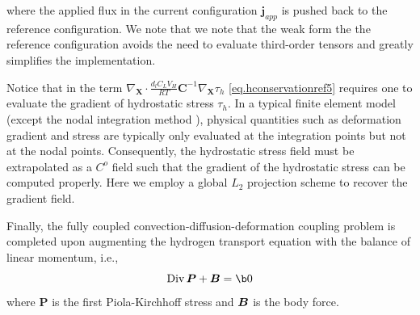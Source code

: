 \documentclass[10pt]{elsarticle}
\newcommand{\mbs}[1]{\boldsymbol{#1}}
\def\bs{{\mbs{s}}} \def\bt{{\mbs{t}}} \def\bu{{\mbs{u}}}
\DeclareMathOperator{\Div}{Div}
\def\bs{\boldsymbol}
\newcommand{\tensor}[1]{\ensuremath{\boldsymbol{#1}}}
\begin{document}
%
where the applied flux in the current configuration $\bs{j}_{app}$ is pushed back to the reference configuration. We note that we note that the weak form the the reference configuration avoids the need to evaluate third-order tensors and greatly simplifies the implementation. 
%
%
%
%
%
%

Notice that in the term 
$\nabla_{\bs{X}}  \cdot \frac{d_{l} C_{L}V_{H}}{RT} \bs{C}^{-1} \nabla_{\bs{X}}\tau_{h}$ \eqref{eq.hconservationref5}
requires one to evaluate the gradient of hydrostatic stress $\tau_{h}$. In a typical finite element model
(except the nodal integration method \cite{Krysl:2008}), physical quantities such as deformation gradient
 and stress are typically only evaluated at the integration points but not at the nodal points. 
 Consequently, the hydrostatic stress field must be extrapolated as a $C^{o}$ field  such that the gradient of the hydrostatic
 stress can be computed properly. Here we employ a global $L_{2}$ projection scheme to recover the gradient field. 
 
Finally, the fully coupled convection-diffusion-deformation coupling problem is completed upon augmenting the hydrogen transport equation with the balance of linear momentum, i.e.,
\begin{equation}
\label{eq:balanceLinearMomentum} \Div \tensor{P} +  \bB = \b0  
\end{equation}
where $\tensor{P}$ is the first Piola-Kirchhoff stress and $\bB$ is the body force. 
%
\end{document}
